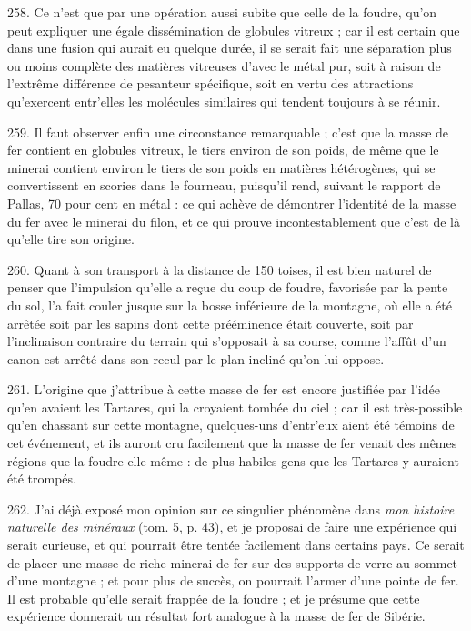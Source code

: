 \documentclass[a4paper, 11pt, oneside, polutonikogreek, french]{article}
\begin{document}
258. Ce n'est que par une opération aussi subite que celle de la foudre, qu'on peut expliquer une égale dissémination de globules vitreux ; car il est certain que dans une fusion qui aurait eu quelque durée, il se serait fait une séparation plus ou moins complète des matières vitreuses d'avec le métal pur, soit à raison de l'extrême différence de pesanteur spécifique, soit en vertu des attractions qu'exercent entr'elles les molécules similaires qui tendent toujours à se réunir.

259. Il faut observer enfin une circonstance remarquable ; c'est que la masse de fer contient en globules vitreux, le tiers environ de son poids, de même que le minerai contient environ le tiers de son poids en matières hétérogènes, qui se convertissent en scories dans le fourneau, puisqu'il rend, suivant le rapport de Pallas, 70 pour cent en métal : ce qui achève de démontrer l'identité de la masse du fer avec le minerai du filon, et ce qui prouve incontestablement que c'est de là qu'elle tire son origine.

260. Quant à son transport à la distance de 150 toises, il est bien naturel de penser que l'impulsion qu'elle a reçue du coup de foudre, favorisée par la pente du sol, l'a fait couler jusque sur la bosse inférieure de la montagne, où elle a été arrêtée soit par les sapins dont cette prééminence était couverte, soit par l'inclinaison contraire du terrain qui s'opposait à sa course, comme l'affût d'un canon est arrêté dans son recul par le plan incliné qu'on lui oppose.

261. L'origine que j'attribue à cette masse de fer est encore justifiée par l'idée qu'en avaient les Tartares, qui la croyaient tombée du ciel ; car il est très-possible qu'en chassant sur cette montagne, quelques-uns d'entr'eux aient été témoins de cet événement, et ils auront cru facilement que la masse de fer venait des mêmes régions que la foudre elle-même : de plus habiles gens que les Tartares y auraient été trompés.

262. J'ai déjà exposé mon opinion sur ce singulier phénomène dans \emph{mon histoire naturelle des minéraux} (tom. 5, p. 43), et je proposai de faire une expérience qui serait curieuse, et qui pourrait être tentée facilement dans certains pays. Ce serait de placer une masse de riche minerai de fer sur des supports de verre au sommet d'une montagne ; et pour plus de succès, on pourrait l'armer d'une pointe de fer. Il est probable qu'elle serait frappée de la foudre ; et je présume que cette expérience donnerait un résultat fort analogue à la masse de fer de Sibérie.
\end{document}
